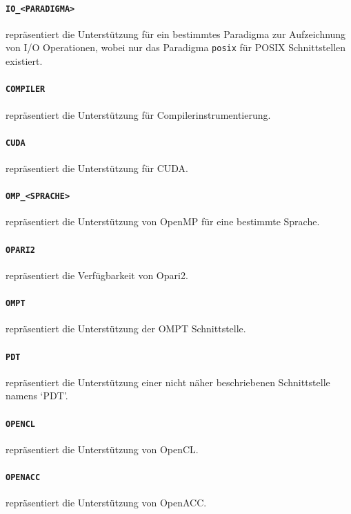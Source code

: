 \documentclass[german,proseminar,hyperref,utf8,lof]{zihpub}
\begin{document}
    \paragraph{\texttt{IO\_<PARADIGMA>}} repräsentiert die Unterstützung für ein bestimmtes Paradigma zur
    Aufzeichnung von I/O Operationen, wobei nur das Paradigma \texttt{posix} für POSIX Schnittstellen existiert.

    \paragraph{\texttt{COMPILER}} repräsentiert die Unterstützung für Compilerinstrumentierung.

    \paragraph{\texttt{CUDA}} repräsentiert die Unterstützung für CUDA.
    
    \paragraph{\texttt{OMP\_<SPRACHE>}} repräsentiert die Unterstützung von OpenMP für eine bestimmte Sprache.

    \paragraph{\texttt{OPARI2}} repräsentiert die Verfügbarkeit von Opari2.

    \paragraph{\texttt{OMPT}} repräsentiert die Unterstützung der OMPT Schnittstelle.

    \paragraph{\texttt{PDT}} repräsentiert die Unterstützung einer nicht näher beschriebenen Schnittstelle
    namens `PDT'.

    \paragraph{\texttt{OPENCL}} repräsentiert die Unterstützung von OpenCL.

    \paragraph{\texttt{OPENACC}} repräsentiert die Unterstützung von OpenACC.
\end{document}
